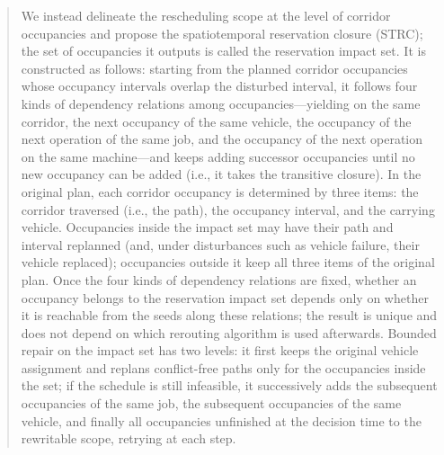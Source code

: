 \documentclass[manuscript,screen,review]{acmart}
\providecommand{\STRC}{\textsc{STRC}}
\begin{document}
\begin{abstract}
We instead delineate the rescheduling scope at the level of corridor occupancies and propose the spatiotemporal reservation closure (\STRC); the set of occupancies it outputs is called the reservation impact set.
It is constructed as follows: starting from the planned corridor occupancies whose occupancy intervals overlap the disturbed interval, it follows four kinds of dependency relations among occupancies---yielding on the same corridor,
the next occupancy of the same vehicle, the occupancy of the next operation of the same job, and the occupancy of the next operation on the same machine---and keeps adding successor occupancies
until no new occupancy can be added (i.e., it takes the transitive closure).
In the original plan, each corridor occupancy is determined by three items: the corridor traversed (i.e., the path), the occupancy interval, and the carrying vehicle. Occupancies inside the impact set may have their path and interval replanned
(and, under disturbances such as vehicle failure, their vehicle replaced); occupancies outside it keep all three items of the original plan.
Once the four kinds of dependency relations are fixed, whether an occupancy belongs to the reservation impact set depends only on whether it is reachable from the seeds along these relations; the result is unique
and does not depend on which rerouting algorithm is used afterwards.
Bounded repair on the impact set has two levels: it first keeps the original vehicle assignment and replans conflict-free paths only for the occupancies inside the set; if the schedule is still infeasible,
it successively adds the subsequent occupancies of the same job, the subsequent occupancies of the same vehicle, and finally all occupancies unfinished at the decision time to the rewritable scope, retrying at each step.


\end{abstract}
\end{document}

